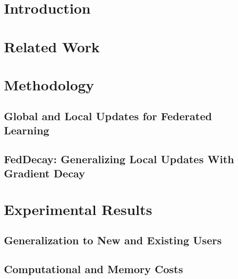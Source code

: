 \documentclass[twoside, 11pt]{article}
\begin{document}
    \section{Introduction}
    \label{sec: decay-intro}
    
    
    \section{Related Work}
    \label{sec: decay-related}
    

    \section{Methodology}
    \label{sec: decay-method}
    

        \subsection{Global and Local Updates for Federated Learning}
        \label{sec: decay-method-updates}
        
        
        \subsection{FedDecay: Generalizing Local Updates With Gradient Decay} 
        \label{sec: decay-method-decay}
        

    \section{Experimental Results}
    \label{sec: decay-exp}
    

        \subsection{Generalization to New and Existing Users}
        \label{sec: decay-exp-gen}
        

        \subsection{Computational and Memory Costs}
        \label{sec: decay-exp-costs}
        
\end{document}
